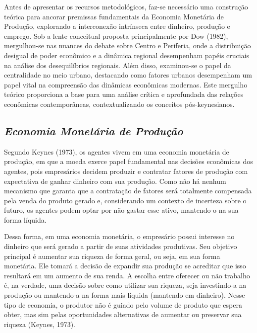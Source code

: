 \documentclass[a4paper,12pt]{article}
\begin{document}
Antes de apresentar os recursos metodológicos, faz-se necessário uma
construção teórica para ancorar premissas fundamentais da Economia
Monetária de Produção, explorando a interconexão intrínseca entre
dinheiro, produção e emprego. Sob a lente conceitual proposta
principalmente por Dow (1982), mergulhou-se nas nuances do debate sobre
Centro e Periferia, onde a distribuição desigual de poder econômico e a
dinâmica regional desempenham papéis cruciais na análise dos
desequilíbrios regionais. Além disso, examinou-se o papel da
centralidade no meio urbano, destacando como fatores urbanos desempenham
um papel vital na compreensão das dinâmicas econômicas modernas. Este
mergulho teórico proporciona a base para uma análise crítica e
aprofundada das relações econômicas contemporâneas, contextualizando os
conceitos pós-keynesianos.

\hypertarget{economia-monetuxe1ria-de-produuxe7uxe3o}{%
\subsection{\texorpdfstring{\emph{Economia Monetária de
Produção}}{Economia Monetária de Produção}}\label{economia-monetuxe1ria-de-produuxe7uxe3o}}

Segundo Keynes (1973), os agentes vivem em uma economia monetária de
produção, em que a moeda exerce papel fundamental nas decisões
econômicas dos agentes, pois empresários decidem produzir e contratar
fatores de produção com expectativa de ganhar dinheiro com sua produção.
Como não há nenhum mecanismo que garanta que a contratação de fatores
será totalmente compensada pela venda do produto gerado e, considerando
um contexto de incerteza sobre o futuro, os agentes podem optar por não
gastar esse ativo, mantendo-o na sua forma líquida.

Dessa forma, em uma economia monetária, o empresário possui interesse no
dinheiro que será gerado a partir de suas atividades produtivas. Seu
objetivo principal é aumentar sua riqueza de forma geral, ou seja, em
sua forma monetária. Ele tomará a decisão de expandir sua produção se
acreditar que isso resultará em um aumento de sua renda. A escolha entre
oferecer ou não trabalho é, na verdade, uma decisão sobre como utilizar
sua riqueza, seja investindo-a na produção ou mantendo-a na forma mais
líquida (mantendo em dinheiro). Nesse tipo de economia, o produtor não é
guiado pelo volume de produto que espera obter, mas sim pelas
oportunidades alternativas de aumentar ou preservar sua riqueza (Keynes,
1973).
\end{document}
